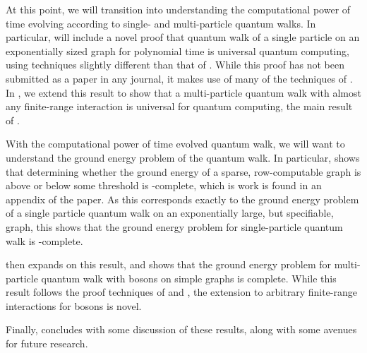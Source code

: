 \documentclass[../thesis-main/thesis-main]{subfiles}
\begin{document}
At this point, we will transition into understanding the computational power of time evolving according to single- and multi-particle quantum walks.  In particular,  will include a novel proof that quantum walk of a single particle on an exponentially sized graph for polynomial time is universal quantum computing, using techniques slightly different than that of \cite{Chi09}.  While this proof has not been submitted as a paper in any journal, it makes use of many of the techniques of \cite{MPQW}.  In , we extend this result to show that a multi-particle quantum walk with almost any finite-range interaction is universal for quantum computing, the main result of \cite{MPQW}.

With the computational power of time evolved quantum walk, we will want to understand the ground energy problem of the quantum walk.  In particular,  shows that determining whether the ground energy of a sparse, row-computable graph is above or below some threshold is \QMA-complete, which is work is found in an appendix of the \cite{BHQMA} paper.  As this corresponds exactly to the ground energy problem of a single particle quantum walk on an exponentially large, but specifiable, graph, this shows that the ground energy problem for single-particle quantum walk is \QMA-complete. 

 then expands on this result, and shows that the ground energy problem for multi-particle quantum walk with bosons on simple graphs is \QMA complete.  While this result follows the proof techniques of \cite{MPQW} and \cite{XYQMA}, the extension to arbitrary finite-range interactions for bosons is novel.

Finally,  concludes with some discussion of these results, along with some avenues for future research.


\biblio{}
\end{document}
